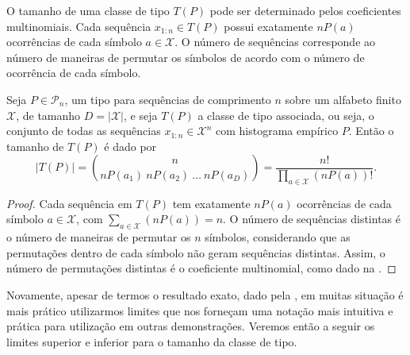 O tamanho de uma classe de tipo $T(P)$ pode ser determinado pelos coeficientes multinomiais.
Cada sequência $x_{1:n} \in T(P)$ possui exatamente $nP(a)$ ocorrências de cada símbolo $a \in \mathcal{X}$.
O número de sequências corresponde ao número de maneiras de permutar os símbolos de acordo com o número de ocorrência de cada símbolo.

\begin{lemma}
    Seja $P \in \mathcal{P}_n$, um tipo para sequências de comprimento $n$ sobre um alfabeto finito $\mathcal{X}$,
    de tamanho $D = \vert\mathcal{X}\vert$, 
    e seja $T(P)$ a classe de tipo associada, ou seja, o conjunto de todas as sequências $x_{1:n} \in \mathcal{X}^n$
    com histograma empírico $P$. Então o tamanho de $T(P)$ é dado por
    \begin{equation}\label{eq:tamclasstipo}
	\vert T(P) \vert = { n \choose nP(a_1) \ nP(a_2) \ \ldots \ nP(a_D) } = \frac{n!}{\prod_{a \in \mathcal{X}} (nP(a))!} .
    \end{equation}
\end{lemma}
\begin{proof}
    Cada sequência em $T(P)$ tem exatamente $nP(a)$ ocorrências de cada símbolo $a \in \mathcal{X}$,
    com $\sum_{a \in \mathcal{X}} (nP(a)) = n$.
    O número de sequências distintas é o número de maneiras de permutar os $n$ símbolos,
    considerando que as permutações dentro de cada símbolo não geram sequências distintas. 
    Assim, o número de permutações distintas é o coeficiente multinomial, como dado na .
\end{proof}

Novamente, apesar de termos o resultado exato, dado pela , em muitas situação
é mais prático utilizarmos limites que nos forneçam uma notação mais intuitiva e prática
para utilização em outras demonstrações. Veremos então a seguir os limites superior e inferior
para o tamanho da classe de tipo.


